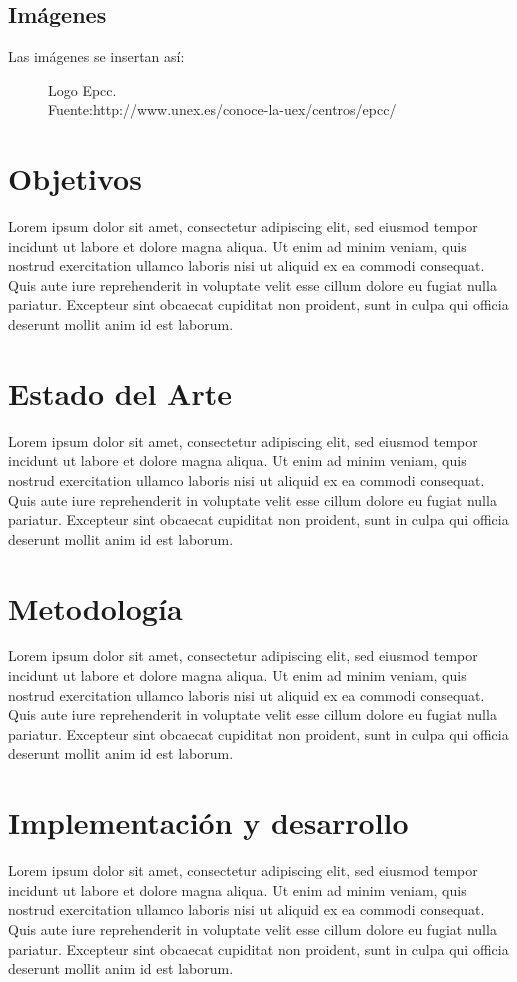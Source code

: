\documentclass[12pt,a4paper,twoside]{book}
\begin{document}
\section{Imágenes}
Las imágenes se insertan así:

\begin{figure}[H]
\centering

\caption[Logo Epcc]{Logo Epcc.\\Fuente:http://www.unex.es/conoce-la-uex/centros/epcc/}
\label{fig:logoEpcc}
\end{figure}

\chapter{Objetivos}
Lorem ipsum dolor sit amet, consectetur adipiscing elit, sed eiusmod tempor incidunt ut labore et dolore magna aliqua. Ut enim ad minim veniam, quis nostrud exercitation ullamco laboris nisi ut aliquid ex ea commodi consequat. Quis aute iure reprehenderit in voluptate velit esse cillum dolore eu fugiat nulla pariatur. Excepteur sint obcaecat cupiditat non proident, sunt in culpa qui officia deserunt mollit anim id est laborum.

\chapter{Estado del Arte}
Lorem ipsum dolor sit amet, consectetur adipiscing elit, sed eiusmod tempor incidunt ut labore et dolore magna aliqua. Ut enim ad minim veniam, quis nostrud exercitation ullamco laboris nisi ut aliquid ex ea commodi consequat. Quis aute iure reprehenderit in voluptate velit esse cillum dolore eu fugiat nulla pariatur. Excepteur sint obcaecat cupiditat non proident, sunt in culpa qui officia deserunt mollit anim id est laborum.

\chapter{Metodología}
Lorem ipsum dolor sit amet, consectetur adipiscing elit, sed eiusmod tempor incidunt ut labore et dolore magna aliqua. Ut enim ad minim veniam, quis nostrud exercitation ullamco laboris nisi ut aliquid ex ea commodi consequat. Quis aute iure reprehenderit in voluptate velit esse cillum dolore eu fugiat nulla pariatur. Excepteur sint obcaecat cupiditat non proident, sunt in culpa qui officia deserunt mollit anim id est laborum.

\chapter{Implementación y desarrollo}
Lorem ipsum dolor sit amet, consectetur adipiscing elit, sed eiusmod tempor incidunt ut labore et dolore magna aliqua. Ut enim ad minim veniam, quis nostrud exercitation ullamco laboris nisi ut aliquid ex ea commodi consequat. Quis aute iure reprehenderit in voluptate velit esse cillum dolore eu fugiat nulla pariatur. Excepteur sint obcaecat cupiditat non proident, sunt in culpa qui officia deserunt mollit anim id est laborum.
\end{document}
